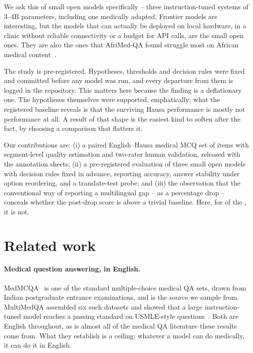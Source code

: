 \documentclass[11pt,a4paper]{article}
\begin{document}
We ask this of small open models specifically -- three instruction-tuned systems
of 3--4B parameters, including one medically adapted. Frontier models are
interesting, but the models that can actually be deployed on local hardware, in
a clinic without reliable connectivity or a budget for API calls, are the small
open ones. They are also the ones that AfriMed-QA found struggle most on
African medical content~\cite{olatunji2025afrimedqa}.

The study is pre-registered. Hypotheses, thresholds and decision rules were
fixed and committed before any model was run, and every departure from them is
logged in the repository. This matters here because the finding is a
deflationary one. The hypotheses themselves were supported, emphatically; what
the registered baseline reveals is that the surviving Hausa performance is
mostly not performance at all. A result of that shape is the easiest kind to
soften after the fact, by choosing a comparison that flatters it.

Our contributions are: (i) a paired English--Hausa medical MCQ set of \NEval{}
items with segment-level quality estimation and two-rater human validation,
released with the annotation sheets; (ii) a pre-registered evaluation of three
small open models with decision rules fixed in advance, reporting accuracy,
answer stability under option reordering, and a translate-test probe; and
(iii) the observation that the conventional way of reporting a multilingual gap
-- as a percentage drop -- conceals whether the post-drop score is above a
trivial baseline. Here, for \NBelowBaseline{} of the \NModels{}, it is not.

\section{Related work}

\paragraph{Medical question answering, in English.}
MedMCQA~\cite{pal2022medmcqa} is one of the standard multiple-choice medical QA
sets, drawn from Indian postgraduate entrance examinations, and is the source we
sample from. MultiMedQA assembled six such datasets and showed that a large
instruction-tuned model reaches a passing standard on USMLE-style
questions~\cite{singhal2023clinical}. Both are English throughout, as is almost
all of the medical QA literature these results come from. What they establish is
a ceiling: whatever a model can do medically, it can do it in English.
\end{document}
